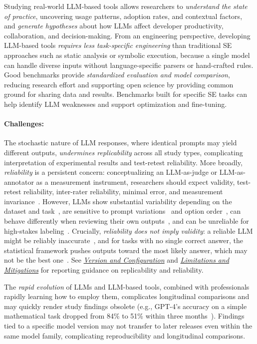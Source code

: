 \documentclass[smallextended]{svjour3}
\newcommand{\modelversion}{\hyperref[sec:report-model-version-configuration-and-customizations]{\emph{Version and Configuration}}\xspace}
\newcommand{\limitationsmitigations}{\hyperref[sec:report-limitations-and-mitigations]{\emph{Limitations and Mitigations}}\xspace}
\newcommand{\modelversion}{\href{/guidelines\#report-model-version-configuration-and-customizations}{\emph{Version and Configuration}}\xspace}
\newcommand{\limitationsmitigations}{\href{/guidelines\#report-limitations-and-mitigations}{\emph{Limitations and Mitigations}}\xspace}
\newcommand{\studytypeparagraph}[1]{\paragraph{\bfseries #1:}}
\newcommand{\studytypeparagraph}[1]{\subsubsection{#1}}
\begin{document}
Studying real-world LLM-based tools allows researchers to \emph{understand the state of practice}, uncovering usage patterns, adoption rates, and contextual factors, and \emph{generate hypotheses} about how LLMs affect developer productivity, collaboration, and decision-making. From an engineering perspective, developing LLM-based tools \emph{requires less task-specific engineering} than traditional SE approaches such as static analysis or symbolic execution, because a single model can handle diverse inputs without language-specific parsers or hand-crafted rules. Good benchmarks provide \emph{standardized evaluation and model comparison}, reducing research effort and supporting open science by providing common ground for sharing data and results. Benchmarks built for specific SE tasks can help identify LLM weaknesses and support optimization and fine-tuning.

\studytypeparagraph{Challenges}

The stochastic nature of LLM responses, where identical prompts may yield different outputs, \emph{undermines replicability} across all study types, complicating interpretation of experimental results and test-retest reliability. More broadly, \emph{reliability} is a persistent concern: conceptualizing an LLM-as-judge or LLM-as-annotator as a measurement instrument, researchers should expect validity, test-retest reliability, inter-rater reliability, minimal error, and measurement invariance~\cite{DBLP:books/sp/24/RalphKAA24}. However, LLMs show substantial variability depending on the dataset and task~\cite{DBLP:journals/corr/abs-2306-00176}, are sensitive to prompt variations~\cite{DBLP:journals/corr/abs-2304-11085} and option order~\cite{DBLP:conf/naacl/PezeshkpourH24}, can behave differently when reviewing their own outputs~\cite{DBLP:conf/nips/PanicksseryBF24}, and can be unreliable for high-stakes labeling~\cite{DBLP:conf/chi/Wang0RMM24}. Crucially, \emph{reliability does not imply validity}: a reliable LLM might be reliably inaccurate~\cite{DBLP:conf/coling/ZhouC024}, and for tasks with no single correct answer, the statistical framework pushes outputs toward the most likely answer, which may not be the best one~\cite{DBLP:journals/corr/abs-2406-18403}. See \modelversion and \limitationsmitigations for reporting guidance on replicability and reliability.

The \emph{rapid evolution} of LLMs and LLM-based tools, combined with professionals rapidly learning how to employ them, complicates longitudinal comparisons and may quickly render study findings obsolete (e.g., GPT-4's accuracy on a simple mathematical task dropped from 84\% to 51\% within three months~\cite{DBLP:journals/corr/abs-2307-09009}).
Findings tied to a specific model version may not transfer to later releases even within the same model family, complicating reproducibility and longitudinal comparisons.
\end{document}
